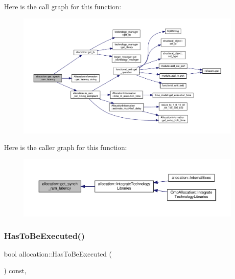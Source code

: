 Here is the call graph for this function\+:
\nopagebreak
\begin{figure}[H]
\begin{center}
\leavevmode
\includegraphics[width=350pt]{d0/d74/classallocation_acef7ab9b504f496fa9367192c5edca22_cgraph}
\end{center}
\end{figure}
Here is the caller graph for this function\+:
\nopagebreak
\begin{figure}[H]
\begin{center}
\leavevmode
\includegraphics[width=350pt]{d0/d74/classallocation_acef7ab9b504f496fa9367192c5edca22_icgraph}
\end{center}
\end{figure}
\mbox{\label{classallocation_af29b72851d7c54b1b6ea0b60daa162de}} 
\subsubsection{\texorpdfstring{Has\+To\+Be\+Executed()}{HasToBeExecuted()}}
{\footnotesize\ttfamily bool allocation\+::\+Has\+To\+Be\+Executed (\begin{DoxyParamCaption}{ }\end{DoxyParamCaption}) const\hspace{0.3cm}{\ttfamily [override]}, {\ttfamily [virtual]}}



